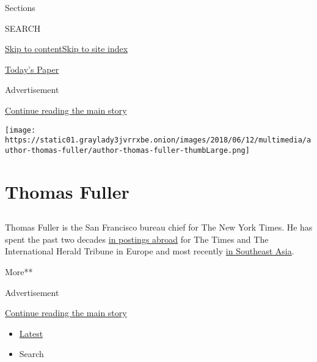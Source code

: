 Sections

SEARCH

\protect\hyperlink{site-content}{Skip to
content}\protect\hyperlink{site-index}{Skip to site index}

\href{https://myaccount.nytimes3xbfgragh.onion/auth/login?response_type=cookie\&client_id=vi}{}

\href{https://www.nytimes3xbfgragh.onion/section/todayspaper}{Today's
Paper}

Advertisement

\protect\hyperlink{after-top}{Continue reading the main story}

\texttt{[image: https://static01.graylady3jvrrxbe.onion/images/2018/06/12/multimedia/author-thomas-fuller/author-thomas-fuller-thumbLarge.png]}

\hypertarget{thomas-fuller}{%
\section{Thomas Fuller}\label{thomas-fuller}}

\subsection{}

Thomas Fuller is the San Francisco bureau chief for The New York Times.
He has spent the past two decades
\href{http://www.nytimes3xbfgragh.onion/2013/10/14/world/asia/asias-lands-of-charm-and-cruelty.html}{in
postings abroad} for The Times and The International Herald Tribune in
Europe and most recently
\href{https://www.nytimes3xbfgragh.onion/2016/02/22/world/asia/reporting-on-life-death-and-corruption-in-southeast-asia.html}{in
Southeast Asia}.

More**

Advertisement

\protect\hyperlink{after-mid1}{Continue reading the main story}

\begin{itemize}
\tightlist
\item
  \protect\hyperlink{stream-panel}{Latest}
\item
  Search
\end{itemize}

